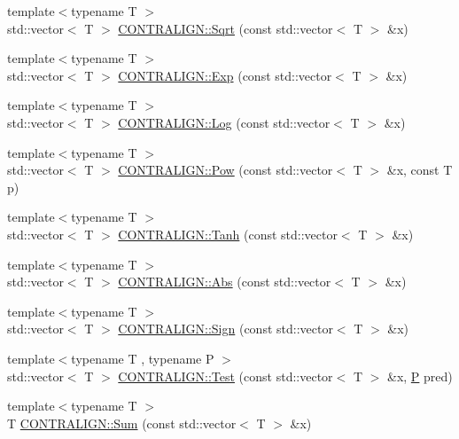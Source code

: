 \begin{DoxyCompactItemize}
\item 
{\footnotesize template$<$typename T $>$ }\\std\+::vector$<$ T $>$ \hyperlink{namespace_c_o_n_t_r_a_l_i_g_n_a816d76c04970024e87d6a1f9a683b5f6}{C\+O\+N\+T\+R\+A\+L\+I\+G\+N\+::\+Sqrt} (const std\+::vector$<$ T $>$ \&x)
\item 
{\footnotesize template$<$typename T $>$ }\\std\+::vector$<$ T $>$ \hyperlink{namespace_c_o_n_t_r_a_l_i_g_n_a0c42332331fc02304c24391c147101aa}{C\+O\+N\+T\+R\+A\+L\+I\+G\+N\+::\+Exp} (const std\+::vector$<$ T $>$ \&x)
\item 
{\footnotesize template$<$typename T $>$ }\\std\+::vector$<$ T $>$ \hyperlink{namespace_c_o_n_t_r_a_l_i_g_n_a2a61e9203cab173f040a408cf9dd9fff}{C\+O\+N\+T\+R\+A\+L\+I\+G\+N\+::\+Log} (const std\+::vector$<$ T $>$ \&x)
\item 
{\footnotesize template$<$typename T $>$ }\\std\+::vector$<$ T $>$ \hyperlink{namespace_c_o_n_t_r_a_l_i_g_n_a17fe7e289f4cde741880207b3acc4130}{C\+O\+N\+T\+R\+A\+L\+I\+G\+N\+::\+Pow} (const std\+::vector$<$ T $>$ \&x, const T p)
\item 
{\footnotesize template$<$typename T $>$ }\\std\+::vector$<$ T $>$ \hyperlink{namespace_c_o_n_t_r_a_l_i_g_n_a2bd0fc4d043cea02c1208cc7a6e43d22}{C\+O\+N\+T\+R\+A\+L\+I\+G\+N\+::\+Tanh} (const std\+::vector$<$ T $>$ \&x)
\item 
{\footnotesize template$<$typename T $>$ }\\std\+::vector$<$ T $>$ \hyperlink{namespace_c_o_n_t_r_a_l_i_g_n_a881da0309b37d990b01dada1819b5d6f}{C\+O\+N\+T\+R\+A\+L\+I\+G\+N\+::\+Abs} (const std\+::vector$<$ T $>$ \&x)
\item 
{\footnotesize template$<$typename T $>$ }\\std\+::vector$<$ T $>$ \hyperlink{namespace_c_o_n_t_r_a_l_i_g_n_aad158156e3616501f89ee66af1cf66ee}{C\+O\+N\+T\+R\+A\+L\+I\+G\+N\+::\+Sign} (const std\+::vector$<$ T $>$ \&x)
\item 
{\footnotesize template$<$typename T , typename P $>$ }\\std\+::vector$<$ T $>$ \hyperlink{namespace_c_o_n_t_r_a_l_i_g_n_a75011b634203a445b81adaf2684162ff}{C\+O\+N\+T\+R\+A\+L\+I\+G\+N\+::\+Test} (const std\+::vector$<$ T $>$ \&x, \hyperlink{pf__duplex_8c_a54f9e847235c2061dfd403c5869b5e2d}{P} pred)
\item 
{\footnotesize template$<$typename T $>$ }\\T \hyperlink{namespace_c_o_n_t_r_a_l_i_g_n_af5acb97fd09c707d30b0ba3a2f4ce343}{C\+O\+N\+T\+R\+A\+L\+I\+G\+N\+::\+Sum} (const std\+::vector$<$ T $>$ \&x)

\end{DoxyCompactItemize}
